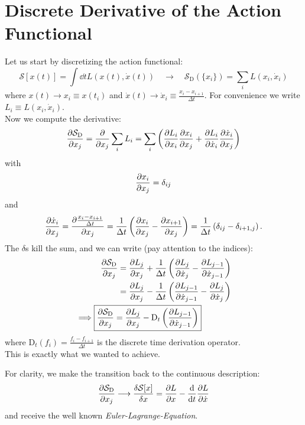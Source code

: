 \documentclass[11pt,a4paper]{scrartcl}
\title{}
\author{Jeremiah Lübke, Franz Wilfarth}
\date{\today}
\newcommand{\SD}{\ensuremath{\mathcal{S}_{\mathrm{D}}}}
\newcommand{\xdoti}{\ensuremath{\dot{x}_i}}
\newcommand{\xdotj}{\ensuremath{\dot{x}_j}}
\newcommand{\xdotjm}{\ensuremath{\dot{x}_{j-1}}}
\newcommand{\deltaij}{\ensuremath{\delta_{ij}}}
\newcommand{\OverDeltaT}[1]{\ensuremath{\frac{#1}{\Delta t}}}
\newcommand{\DT}{\ensuremath{\mathrm{D}_t}}
\begin{document}
\maketitle

\section*{Discrete Derivative of the Action Functional}
Let us start by discretizing the action functional:
\begin{equation*}
    \mathcal{S}\left[x(t)\right] = \int\dd{t}L\left(x(t), \dot{x}(t)\right)
    \quad\longrightarrow\quad
    \SD\left(\{x_i\}\right) = \sum_i L\left(x_i, \xdoti\right)
\end{equation*}
where $x(t) \longrightarrow x_i \equiv x(t_i)$ and $\dot{x}(t) \longrightarrow
\xdoti \equiv \OverDeltaT{x_{i}-x_{i+1}}$. For convenience we write $L_i \equiv
L(x_i, \xdoti)$.\\

Now we compute the derivative:
\begin{equation*}
    \pdv{\SD}{x_j}=\pdv{x_j}\sum_i L_i
    =\sum_i\left(\pdv{L_i}{x_i}\pdv{x_i}{x_j}+\pdv{L_i}{\xdoti}\pdv{\xdoti}{x_j}\right)
\end{equation*}
with
\begin{equation*}
    \pdv{x_i}{x_j}=\deltaij
\end{equation*}
and
\begin{equation*}
    \pdv{\xdoti}{x_j}=\pdv{\OverDeltaT{x_{i}-x_{i+1}}}{x_j}
    =\OverDeltaT{1}\left(\pdv{x_i}{x_j}-\pdv{x_{i+1}}{x_j}\right)
    =\OverDeltaT{1}\left(\deltaij-\delta_{i+1,j}\right).
\end{equation*}
The $\delta$s kill the sum, and we can write (pay attention to the indices):
\begin{align*}
    \pdv{\SD}{x_j}&=\pdv{L_j}{x_j}+\OverDeltaT{1}\left(\pdv{L_j}{\xdotj}-\pdv{L_{j-1}}{\xdotjm}\right)\\
    &=\pdv{L_j}{x_j}-\OverDeltaT{1}\left(\pdv{L_{j-1}}{\xdotjm}-\pdv{L_j}{\xdotj}\right)\\
    \implies\Aboxed{\pdv{\SD}{x_j}&=\pdv{L_j}{x_j}-\DT\left(\pdv{L_{j-1}}{\xdotjm}\right)}
\end{align*}
where $\DT(f_i)=\OverDeltaT{f_{i}-f_{i+1}}$ is the discrete time derivation
operator.\\
This is exactly what we wanted to achieve.

For clarity, we make the transition back to the continuous description:
\begin{equation*}
    \pdv{\SD}{x_j}\longrightarrow\fdv{\mathcal{S}[x]}{x}=\pdv{L}{x}-\dv{t}\pdv{L}{\dot{x}}
\end{equation*}
and receive the well known \emph{Euler-Lagrange-Equation}.
\end{document}
